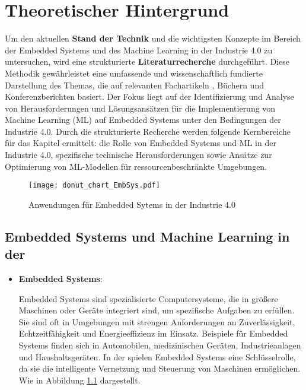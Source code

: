 \chapter{Theoretischer Hintergrund}
\label{chap:theoretische_hintergrund}

Um den aktuellen \textbf{Stand der Technik} und die wichtigsten Konzepte im Bereich der Embedded Systems und des 
Machine Learning in der Industrie 4.0 zu untersuchen, wird eine strukturierte \textbf{Literaturrecherche} durchgeführt. 
Diese Methodik gewährleistet eine umfassende und wissenschaftlich fundierte Darstellung des Themas, die auf relevanten 
Fachartikeln \cite{10087221}, Büchern \cite{Soldatos2024} und Konferenzberichten \cite{8119409} basiert. Der Fokus liegt 
auf der Identifizierung und Analyse von Herausforderungen und Lösungsansätzen für die Implementierung von Machine Learning (ML) 
auf Embedded Systems unter den Bedingungen der Industrie 4.0. Durch die strukturierte Recherche werden folgende Kernbereiche 
für das Kapitel ermittelt: die Rolle von Embedded Systems und ML in der Industrie 4.0, spezifische technische Herausforderungen 
sowie Ansätze zur Optimierung von ML-Modellen für ressourcenbeschränkte Umgebungen.
\begin{figure}[h]
    \centering
    \texttt{[image: donut\_chart\_EmbSys.pdf]}
    \caption{Anwendungen für Embedded Sytems in der Industrie 4.0} 
    \label{fig:donut_chart_EmbSys}
\end{figure}

\section{Embedded Systems und Machine Learning in der \Iviernull}

\begin{itemize}
    \item \textbf{Embedded Systems}: 

    Embedded Systems sind spezialisierte Computersysteme, die in größere Maschinen oder Geräte integriert sind,
    um spezifische Aufgaben zu erfüllen. Sie sind oft in Umgebungen mit strengen Anforderungen an Zuverlässigkeit, 
    Echtzeitfähigkeit und Energieeffizienz im Einsatz. Beispiele für Embedded Systems finden sich in Automobilen, 
    medizinischen Geräten, Industrieanlagen und Haushaltsgeräten. In der \Iviernull spielen Embedded Systems eine Schlüsselrolle, 
    da sie die intelligente Vernetzung und Steuerung von Maschinen ermöglichen. Wie in Abbildung \ref{fig:donut_chart_EmbSys} dargestellt.

\end{itemize}



